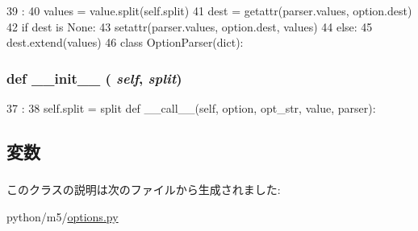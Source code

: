 \begin{DoxyCode}
39                                                       :
40         values = value.split(self.split)
41         dest = getattr(parser.values, option.dest)
42         if dest is None:
43             setattr(parser.values, option.dest, values)
44         else:
45             dest.extend(values)
46 
class OptionParser(dict):
\end{DoxyCode}
\hypertarget{classm5_1_1options_1_1splitter_ac775ee34451fdfa742b318538164070e}{
\subsubsection[{\_\-\_\-init\_\-\_\-}]{\setlength{\rightskip}{0pt plus 5cm}def \_\-\_\-init\_\-\_\- ( {\em self}, \/   {\em split})}}
\label{classm5_1_1options_1_1splitter_ac775ee34451fdfa742b318538164070e}



\begin{DoxyCode}
37                              :
38         self.split = split
    def __call__(self, option, opt_str, value, parser):
\end{DoxyCode}


\subsection{変数}
\hypertarget{classm5_1_1options_1_1splitter_a67f23769dfcb36d2355c8fa05dbf3b59}{
\subsubsection[{split}]{}}
\label{classm5_1_1options_1_1splitter_a67f23769dfcb36d2355c8fa05dbf3b59}


このクラスの説明は次のファイルから生成されました:\begin{DoxyCompactItemize}
\item 
python/m5/\hyperlink{options_8py}{options.py}\end{DoxyCompactItemize}
